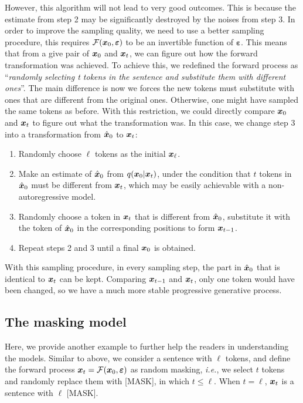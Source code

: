 However, this algorithm will not lead to very good outcomes. This is because the estimate from step 2 may be significantly destroyed by the noises from step 3. In order to improve the sampling quality, we need to use a better sampling procedure, this requires $\mathcal{F}(\bm{x}_0,\bm{\varepsilon})$ to be an invertible function of $\bm{\varepsilon}$. This means that from a give pair of $\bm{x}_0$ and $\bm{x}_{t}$, we can figure out how the forward transformation was achieved. To achieve this, we redefined the forward process as ``\emph{randomly selecting t tokens in the sentence and substitute them with different ones}''. The main difference is now we forces the new tokens must substitute with ones that are different from the original ones. Otherwise, one might have sampled the same tokens as before. With this restriction, we could directly compare $\bm{x}_0$ and $\bm{x}_{t}$ to figure out what the transformation was. In this case, we change step 3 into a transformation from $\hat{\bm{x}}_0$ to $\bm{x}_{t}$:
\begin{myquote}
    \begin{enumerate}
        \item Randomly choose $\ell$ tokens as the initial $\bm{x}_\ell$.
        \item Make an estimate of $\hat{\bm{x}}_0$ from $q(\bm{x}_0|\bm{x}_{t})$, under the condition that $t$ tokens in $\hat{\bm{x}}_0$ must be different from $\bm{x}_{t}$, which may be easily achievable with a non-autoregressive model.
        \item Randomly choose a token in $\bm{x}_{t}$ that is different from $\hat{\bm{x}}_0$, substitute it with the token of $\hat{\bm{x}}_0$ in the corresponding positions to form $\bm{x}_{t-1}$.
        \item Repeat steps 2 and 3 until a final $\bm{x}_0$ is obtained.
    \end{enumerate}
\end{myquote}

With this sampling procedure, in every sampling step, the part in $\hat{\bm{x}}_0$ that is identical to $\bm{x}_{t}$ can be kept. Comparing $\bm{x}_{t-1}$ and $\bm{x}_{t}$, only one token would have been changed, so we have a much more stable progressive generative process. 

\subsection{The masking model}
Here, we provide  another example to further help the readers in understanding the models. Similar to above, we consider a sentence with $\ell$ tokens, and define the forward process $\bm{x}_{t}=\mathcal{F}(\bm{x}_0,\bm{\varepsilon})$ as random masking, \emph{i.e.}, we select $t$ tokens and randomly replace them with [MASK], in which $t\leq \ell$. When $t=\ell$, $\bm{x}_{t}$ is a sentence with $\ell$ [MASK].

